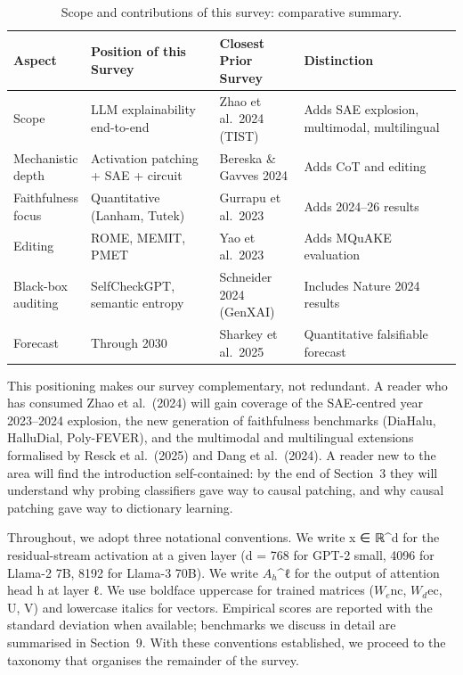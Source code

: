 \documentclass{article}
\begin{document}
\begin{table}[t]
\centering
\caption{Scope and contributions of this survey: comparative summary.}
\label{tab:scope-and-contributions-of-this-survey}
\begin{tabular}{>{\raggedright\arraybackslash}p{0.1500\linewidth}
  >{\raggedright\arraybackslash}p{0.2917\linewidth}
  >{\raggedright\arraybackslash}p{0.1917\linewidth}
  >{\raggedright\arraybackslash}p{0.3667\linewidth}}
\toprule
Aspect & Position of this Survey & Closest Prior Survey & Distinction \\
\midrule
Scope & LLM explainability end-to-end & Zhao et al.~2024 (TIST) & Adds SAE explosion, multimodal, multilingual \\
Mechanistic depth & Activation patching + SAE + circuit & Bereska \& Gavves 2024 & Adds CoT and editing \\
Faithfulness focus & Quantitative (Lanham, Tutek) & Gurrapu et al.~2023 & Adds 2024--26 results \\
Editing & ROME, MEMIT, PMET & Yao et al.~2023 & Adds MQuAKE evaluation \\
Black-box auditing & SelfCheckGPT, semantic entropy & Schneider 2024 (GenXAI) & Includes Nature 2024 results \\
Forecast & Through 2030 & Sharkey et al.~2025 & Quantitative falsifiable forecast \\
\end{tabular}
\end{table}

This positioning makes our survey complementary, not redundant. A reader who has consumed Zhao et al.~(2024) will gain coverage of the SAE-centred year 2023--2024 explosion, the new generation of faithfulness benchmarks (DiaHalu, HalluDial, Poly-FEVER), and the multimodal and multilingual extensions formalised by Resck et al.~(2025) and Dang et al.~(2024). A reader new to the area will find the introduction self-contained: by the end of Section~3 they will understand why probing classifiers gave way to causal patching, and why causal patching gave way to dictionary learning.

Throughout, we adopt three notational conventions. We write x ∈ ℝ\^{}d for the residual-stream activation at a given layer (d = 768 for GPT-2 small, 4096 for Llama-2 7B, 8192 for Llama-3 70B). We write \(A_h\)\^{}ℓ for the output of attention head h at layer ℓ. We use boldface uppercase for trained matrices (\(W_e\)nc, \(W_d\)ec, U, V) and lowercase italics for vectors. Empirical scores are reported with the standard deviation when available; benchmarks we discuss in detail are summarised in Section~9. With these conventions established, we proceed to the taxonomy that organises the remainder of the survey.
\end{document}
